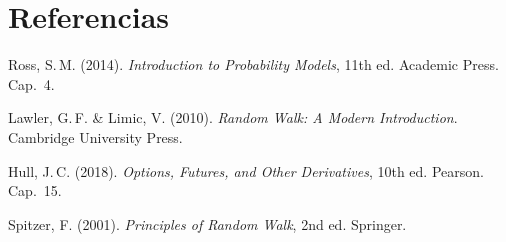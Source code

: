 \documentclass[11pt, letterpaper]{article}
\begin{document}
\section*{Referencias}
\begin{enumerate}[label={[\arabic*]}]
    \item Ross, S.\,M. (2014). \textit{Introduction to Probability Models}, 11th ed. Academic Press. Cap.~4.
    \item Lawler, G.\,F. \& Limic, V. (2010). \textit{Random Walk: A Modern Introduction}. Cambridge University Press.
    \item Hull, J.\,C. (2018). \textit{Options, Futures, and Other Derivatives}, 10th ed. Pearson. Cap.~15.
    \item Spitzer, F. (2001). \textit{Principles of Random Walk}, 2nd ed. Springer.
\end{enumerate}
\end{document}
